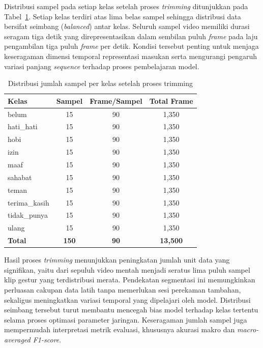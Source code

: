 Distribusi sampel pada setiap kelas setelah proses \textit{trimming} ditunjukkan pada Tabel~\ref{tab:4-distribusi-kelas}.
Setiap kelas terdiri atas lima belas sampel sehingga distribusi data bersifat seimbang (\textit{balanced}) antar kelas.
Seluruh sampel video memiliki durasi seragam tiga detik yang direpresentasikan dalam sembilan puluh \textit{frame} pada laju pengambilan tiga puluh \textit{frame} per detik.
Kondisi tersebut penting untuk menjaga keseragaman dimensi temporal representasi masukan serta mengurangi pengaruh variasi panjang \textit{sequence} terhadap proses pembelajaran model.

\begin{table}[H]
    \centering
    \caption{Distribusi jumlah sampel per kelas setelah proses trimming}
    \label{tab:4-distribusi-kelas}
    \renewcommand{\arraystretch}{1.1}
    \begin{tabular}{|l|c|c|c|}
    \hline
    \textbf{Kelas} & \textbf{Sampel} & \textbf{Frame/Sampel} & \textbf{Total Frame} \\ \hline
    belum        & 15 & 90 & 1,350 \\ \hline
    hati\_hati   & 15 & 90 & 1,350 \\ \hline
    hobi         & 15 & 90 & 1,350 \\ \hline
    izin         & 15 & 90 & 1,350 \\ \hline
    maaf         & 15 & 90 & 1,350 \\ \hline
    sahabat      & 15 & 90 & 1,350 \\ \hline
    teman        & 15 & 90 & 1,350 \\ \hline
    terima\_kasih & 15 & 90 & 1,350 \\ \hline
    tidak\_punya & 15 & 90 & 1,350 \\ \hline
    ulang        & 15 & 90 & 1,350 \\ \hline
    \textbf{Total} & \textbf{150} & \textbf{90} & \textbf{13,500} \\ \hline
    \end{tabular}
\end{table}

Hasil proses \textit{trimming} menunjukkan peningkatan jumlah unit data yang signifikan, yaitu dari sepuluh video mentah menjadi seratus lima puluh sampel klip gestur yang terdistribusi merata. 
Pendekatan segmentasi ini memungkinkan perluasan cakupan data latih tanpa memerlukan sesi perekaman tambahan, sekaligus meningkatkan variasi temporal yang dipelajari oleh model. 
Distribusi seimbang tersebut turut membantu mencegah bias model terhadap kelas tertentu selama proses optimasi parameter jaringan. 
Keseragaman jumlah sampel juga mempermudah interpretasi metrik evaluasi, khususnya akurasi makro dan \textit{macro-averaged F1-score}.

